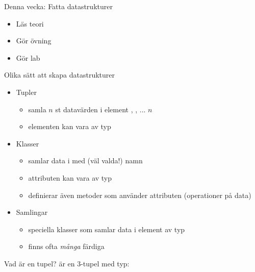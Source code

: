 
\begin{Slide}{Denna vecka: Fatta datastrukturer}
\begin{itemize}
\item Läs teori
\item Gör övning 
\item Gör lab 
\end{itemize}
\end{Slide}


\begin{Slide}{Olika sätt att skapa datastrukturer}
\begin{itemize}
\item Tupler
  \begin{itemize}
  \item samla $n$ st datavärden i element , , ...  \code{_}$n$
  \item elementen kan vara av  typ
  \end{itemize}
\item Klasser   
  \begin{itemize}
  \item samlar data i  med (väl valda!) namn
  \item attributen kan vara av  typ
  \item definierar även metoder som använder attributen (operationer på data)
  \end{itemize}

\item Samlingar 
  \begin{itemize}
  \item speciella klasser som samlar data i element av  typ
  \item finns ofta \emph{många} färdiga  
  \end{itemize}
\end{itemize}
\end{Slide}

\begin{Slide}{Vad är en tupel?}
 är en 3-tupel med typ: 
\end{Slide}


